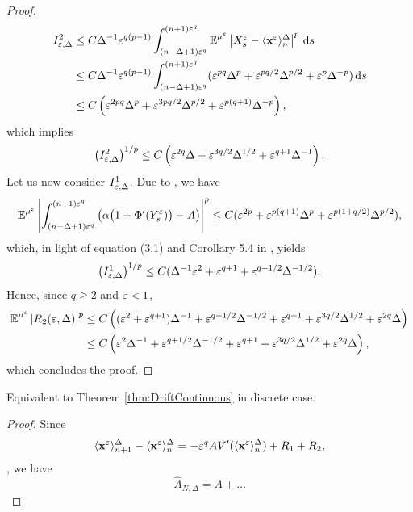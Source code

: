 \documentclass[10pt]{article}
\begin{document}
\begin{proof}
\begin{equation}
	\begin{aligned}
		I_{\varepsilon, \Delta}^2 &\leq C \Delta^{-1} \varepsilon^{q(p-1)}  \int_{(n-\Delta+1)\varepsilon^q}^{(n+1)\varepsilon^q} \operatorname{\mathbb{E}}^{\mu^\varepsilon} \left\lvert X^\varepsilon_s - \langle \mathbf x^\varepsilon \rangle^\Delta_n\right\rvert^p \,\mathrm{d} s \\
		&\leq C \Delta^{-1} \varepsilon^{q(p-1)}  \int_{(n-\Delta+1)\varepsilon^q}^{(n+1)\varepsilon^q} (\varepsilon^{pq}\Delta^p + \varepsilon^{pq/2}\Delta^{p/2} + \varepsilon^p\Delta^{-p}) \,\mathrm{d} s \\
		&\leq C \left(\varepsilon^{2pq}\Delta^p + \varepsilon^{3pq/2}\Delta^{p/2} + \varepsilon^{p(q+1)}\Delta^{-p}\right),
	\end{aligned}
	\end{equation}
	which implies
	\begin{equation}
		\left(I_{\varepsilon, \Delta}^2\right)^{1/p} \leq C\left(\varepsilon^{2q}\Delta + \varepsilon^{3q/2}\Delta^{1/2} + \varepsilon^{q+1}\Delta^{-1}\right).
	\end{equation}
	Let us now consider $I^1_{\varepsilon, \Delta}$. Due to \cite[Lemma 5.6]{PaS07}, we have
	\begin{equation}
		\operatorname{\mathbb{E}}^{\mu^\varepsilon}\left\lvert\int_{(n-\Delta+1)\varepsilon^q}^{(n+1)\varepsilon^q} \left(\alpha\big(1 + \Phi'(Y^\varepsilon_s)\big) -  A\right)\right\rvert^p \leq C(\varepsilon^{2p} + \varepsilon^{p(q+1)}\Delta^p + \varepsilon^{p(1+q/2)}\Delta^{p/2}),
	\end{equation}
	which, in light of equation (3.1) and Corollary 5.4 in \cite{PaS07}, yields
	\begin{equation}
		\left(I_{\varepsilon, \Delta}^1\right)^{1/p} \leq C(\Delta^{-1}\varepsilon^2 + \varepsilon^{q+1} + \varepsilon^{q+1/2}\Delta^{-1/2}).
	\end{equation}
	Hence, since $q \geq 2$ and $\varepsilon < 1$,
	\begin{equation}
	\begin{aligned}
		\operatorname{\mathbb{E}}^{\mu^\varepsilon}\left\lvert R_2(\varepsilon, \Delta)\right\rvert^p &\leq C\left((\varepsilon^2 + \varepsilon^{q+1})\Delta^{-1} + \varepsilon^{q+1/2}\Delta^{-1/2} + \varepsilon^{q+1} + \varepsilon^{3q/2}\Delta^{1/2} + \varepsilon^{2q}\Delta  \right) \\
		&\leq C\left(\varepsilon^2\Delta^{-1} + \varepsilon^{q+1/2}\Delta^{-1/2} + \varepsilon^{q+1} + \varepsilon^{3q/2}\Delta^{1/2} + \varepsilon^{2q}\Delta  \right),
	\end{aligned}
	\end{equation}
	which concludes the proof.
\end{proof}

\begin{theorem} Equivalent to Theorem \ref{thm:DriftContinuous} in discrete case.
\end{theorem}

\begin{proof} Since 
	\begin{equation}
		\langle \mathbf x^\varepsilon\rangle^\Delta_{n+1} - \langle \mathbf x^\varepsilon\rangle^\Delta_n = -\varepsilon^q A V'(\langle \mathbf x^\varepsilon\rangle^\Delta_n) + R_1 + R_2,
	\end{equation}
	, we have
	\begin{equation}
		\widehat A_{N, \Delta} = A + \ldots
	\end{equation}
\end{proof}
\end{document}
